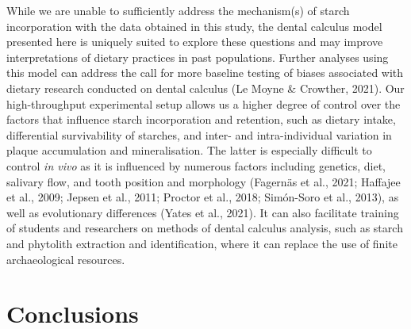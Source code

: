 \documentclass[
]{article}
\begin{document}
While we are unable to sufficiently address the
mechanism(s) of starch incorporation with the data obtained in this study,
the dental calculus model presented here is uniquely suited to explore
these questions and may improve interpretations of dietary practices in past
populations. Further analyses using this model can address the call for more
baseline testing of biases associated with dietary research conducted on dental calculus
(Le Moyne \& Crowther, 2021).
Our high-throughput experimental setup allows us a
higher degree of control over the factors that influence starch incorporation and
retention, such as dietary intake, differential survivability of starches,
and inter- and intra-individual variation in plaque accumulation and mineralisation.
The latter is especially difficult to control \emph{in vivo} as it is influenced by
numerous factors including genetics, diet, salivary flow, and tooth position and
morphology
(Fagernäs et al., 2021; Haffajee et al., 2009; Jepsen et al., 2011; Proctor et al., 2018; Simón-Soro et al., 2013),
as well as evolutionary differences (Yates et al., 2021).
It can also facilitate training of students and researchers on methods of
dental calculus analysis, such as starch and phytolith extraction and
identification, where it can replace the use of finite archaeological resources.

\hypertarget{conclusions}{%
\section{Conclusions}\label{conclusions}}
\end{document}
